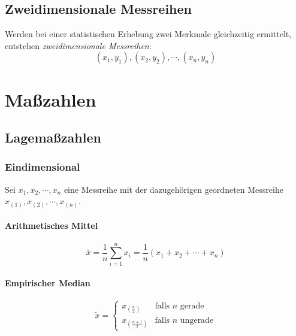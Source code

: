         \subsection{Zweidimensionale Messreihen}
            Werden bei einer statistischen Erhebung zwei Merkmale gleichzeitig ermittelt, entstehen \textit{zweidimensionale Messreihen}:
            \begin{equation*}
                (x_1, y_1), (x_2, y_2), \cdots, (x_n, y_n)
            \end{equation*}

    \section{Maßzahlen}
        \subsection{Lagemaßzahlen}
            \subsubsection{Eindimensional}
                Sei \( x_1, x_2, \cdots, x_n \) eine Messreihe mit der dazugehörigen geordneten Messreihe \( x_{(1)}, x_{(2)}, \cdots, x_{(n)} \).
            
                \paragraph{Arithmetisches Mittel}
                \begin{equation*}
	                \bar{x} = \frac{1}{n} \sum_{i=1}^n x_i = \frac{1}{n} (x_1 + x_2 + \cdots + x_n)
                \end{equation*}
                
                \paragraph{Empirischer Median}
                \begin{equation*}
	                \tilde{x} =
	                \begin{cases}
	                	x_{(\frac{n}{2})}   & \textrm{falls } n \textrm{ gerade}   \\
	                	x_{(\frac{n+1}{2})} & \textrm{falls } n \textrm{ ungerade}
	                \end{cases}
                \end{equation*}
                
